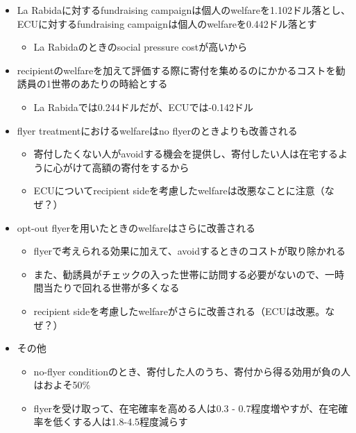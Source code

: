\documentclass[../root]{subfiles}
\begin{document}
    \begin{itemize}
        \item La Rabidaに対するfundraising campaignは個人のwelfareを1.102ドル落とし、ECUに対するfundraising campaignは個人のwelfareを0.442ドル落とす
        \begin{itemize}
            \item La Rabidaのときのsocial pressure costが高いから
        \end{itemize}
        \item recipientのwelfareを加えて評価する際に寄付を集めるのにかかるコストを勧誘員の1世帯のあたりの時給とする
        \begin{itemize}
            \item La Rabidaでは0.244ドルだが、ECUでは-0.142ドル
        \end{itemize}
        \item flyer treatmentにおけるwelfareはno flyerのときよりも改善される
        \begin{itemize}
            \item 寄付したくない人がavoidする機会を提供し、寄付したい人は在宅するように心がけて高額の寄付をするから
            \item ECUについてrecipient sideを考慮したwelfareは改悪なことに注意（なぜ？）
        \end{itemize}
        \item opt-out flyerを用いたときのwelfareはさらに改善される
        \begin{itemize}
            \item flyerで考えられる効果に加えて、avoidするときのコストが取り除かれる
            \item また、勧誘員がチェックの入った世帯に訪問する必要がないので、一時間当たりで回れる世帯が多くなる
            \item recipient sideを考慮したwelfareがさらに改善される（ECUは改悪。なぜ？）
        \end{itemize}
        \item その他
        \begin{itemize}
            \item no-flyer conditionのとき、寄付した人のうち、寄付から得る効用が負の人はおよそ50\%
            \item flyerを受け取って、在宅確率を高める人は0.3 - 0.7程度増やすが、在宅確率を低くする人は1.8-4.5程度減らす
        \end{itemize}
    \end{itemize}


    \biblio
\end{document}
